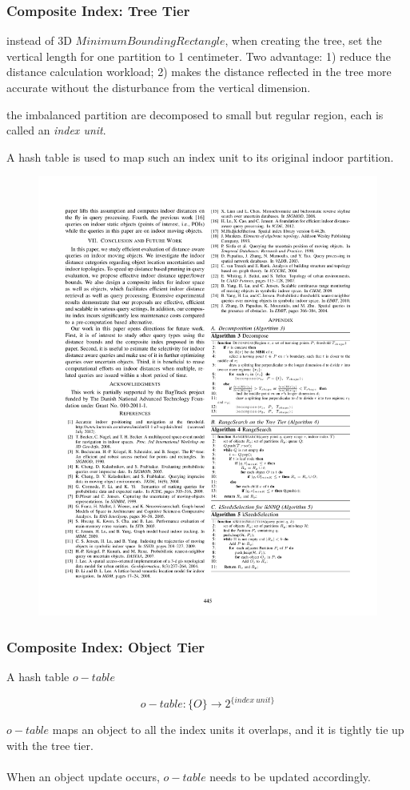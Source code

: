 \begin{frame}
\frametitle{Composite Index: Tree Tier}

\begin{fitemize}
  \item instead of 3D $Minimum Bounding Rectangle$, when creating the tree, set the vertical length for one partition to 1 centimeter. Two advantage: 1) reduce the distance calculation workload; 2) makes the distance reflected in the tree more accurate without the disturbance from the vertical dimension.
  \item the imbalanced partition are decomposed to small but regular region, each is called an \emph{index unit}.
  \item A hash table is used to map such an index unit to its original indoor partition.
\end{fitemize}

\vspace{-10pt}
\begin{figure}[tb]
  \includegraphics[width=0.55\columnwidth]{figures/2-6/2-6-10.pdf}
\end{figure}

\end{frame}


\begin{frame}
\frametitle{Composite Index: Object Tier}

A hash table $o-table$

\begin{equation*}
  o-table : \{ O \} \rightarrow 2^{\{index~unit\}}
\end{equation*}

$o-table$ maps an object to all the index units it overlaps, and it is tightly tie up with the tree tier.\\~\\

When an object update occurs, $o-table$ needs to be updated accordingly.

\end{frame}

